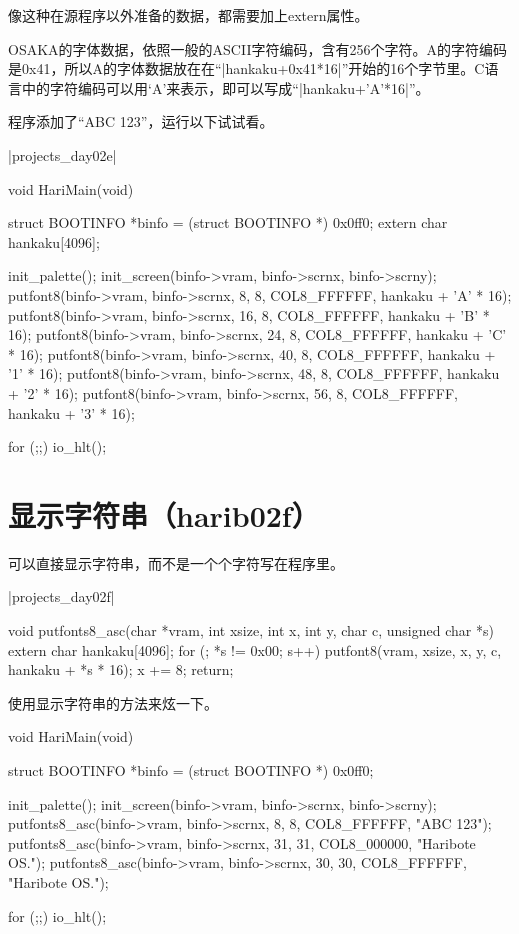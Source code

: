像这种在源程序以外准备的数据，都需要加上extern属性。

\cs

OSAKA的字体数据，依照一般的ASCII字符编码，含有256个字符。A的字符编码是0x41，所以A的字体数据放在在“|hankaku+0x41*16|”开始的16个字节里。C语言中的字符编码可以用‘A’来表示，即可以写成“|hankaku+'A'*16|”。

程序添加了“ABC 123”，运行以下试试看。

\dag|projects_day\harib02e|
\begin{code}[label=bootpack.c]
void HariMain(void)
{
	struct BOOTINFO *binfo = (struct BOOTINFO *) 0x0ff0;
	extern char hankaku[4096];

	init_palette();
	init_screen(binfo->vram, binfo->scrnx, binfo->scrny);
	putfont8(binfo->vram, binfo->scrnx,  8, 8, COL8_FFFFFF, hankaku + 'A' * 16);
	putfont8(binfo->vram, binfo->scrnx, 16, 8, COL8_FFFFFF, hankaku + 'B' * 16);
	putfont8(binfo->vram, binfo->scrnx, 24, 8, COL8_FFFFFF, hankaku + 'C' * 16);
	putfont8(binfo->vram, binfo->scrnx, 40, 8, COL8_FFFFFF, hankaku + '1' * 16);
	putfont8(binfo->vram, binfo->scrnx, 48, 8, COL8_FFFFFF, hankaku + '2' * 16);
	putfont8(binfo->vram, binfo->scrnx, 56, 8, COL8_FFFFFF, hankaku + '3' * 16);

	for (;;) {
		io_hlt();
	}
}
\end{code}

\section{	显示字符串（harib02f）	}
可以直接显示字符串，而不是一个个字符写在程序里。

\dag|projects_day\harib02f|
\begin{code}[label=bootpack.c]
void putfonts8_asc(char *vram, int xsize, int x, int y, char c, unsigned char *s)
{
	extern char hankaku[4096];
	for (; *s != 0x00; s++) {
		putfont8(vram, xsize, x, y, c, hankaku + *s * 16);
		x += 8;
	}
	return;
}
\end{code}

使用显示字符串的方法来炫一下。
\begin{code}[label=bootpack.c]
void HariMain(void)
{
	struct BOOTINFO *binfo = (struct BOOTINFO *) 0x0ff0;

	init_palette();
	init_screen(binfo->vram, binfo->scrnx, binfo->scrny);
	putfonts8_asc(binfo->vram, binfo->scrnx,  8,  8, COL8_FFFFFF, "ABC 123");
	putfonts8_asc(binfo->vram, binfo->scrnx, 31, 31, COL8_000000, "Haribote OS.");
	putfonts8_asc(binfo->vram, binfo->scrnx, 30, 30, COL8_FFFFFF, "Haribote OS.");

	for (;;) {
		io_hlt();
	}
}
\end{code}

